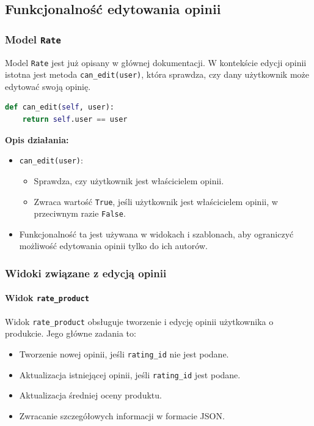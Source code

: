 \documentclass[12pt,a4paper,oneside]{article}
\theoremstyle{definition}
\numberwithin{equation}{section}
\begin{document}
% 
% 
\clearpage
\subsection{Funkcjonalność edytowania opinii}

\subsubsection{Model \texttt{Rate}}
Model \texttt{Rate} jest już opisany w głównej dokumentacji. W kontekście edycji opinii istotna jest metoda \texttt{can\_edit(user)}, która sprawdza, czy dany użytkownik może edytować swoją opinię.

\begin{lstlisting}[language=Python, caption=Metoda \texttt{can\_edit}]
def can_edit(self, user):
    return self.user == user
\end{lstlisting}

\textbf{Opis działania:}
\begin{itemize}
    \item \texttt{can\_edit(user)}:
    \begin{itemize}
        \item Sprawdza, czy użytkownik jest właścicielem opinii.
        \item Zwraca wartość \texttt{True}, jeśli użytkownik jest właścicielem opinii, w przeciwnym razie \texttt{False}.
    \end{itemize}
    \item Funkcjonalność ta jest używana w widokach i szablonach, aby ograniczyć możliwość edytowania opinii tylko do ich autorów.
\end{itemize}



\subsubsection{Widoki związane z edycją opinii}

\paragraph{Widok \texttt{rate\_product}}
Widok \texttt{rate\_product} obsługuje tworzenie i edycję opinii użytkownika o produkcie. Jego główne zadania to:
\begin{itemize}
    \item Tworzenie nowej opinii, jeśli \texttt{rating\_id} nie jest podane.
    \item Aktualizacja istniejącej opinii, jeśli \texttt{rating\_id} jest podane.
    \item Aktualizacja średniej oceny produktu.
    \item Zwracanie szczegółowych informacji w formacie JSON.
\end{itemize}
\end{document}
